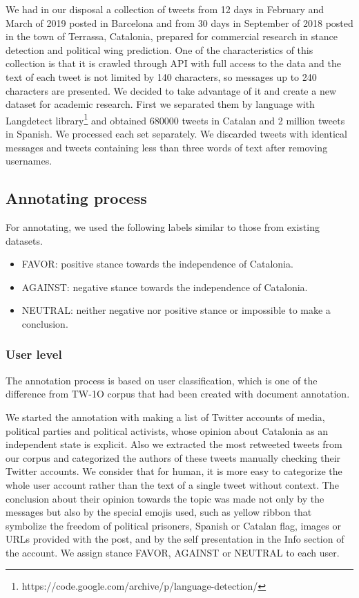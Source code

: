 \documentclass[10pt, a4paper]{article}
\begin{document}
We had in our disposal a collection of tweets from 12 days in February and March of 2019 posted in Barcelona and from 30 days in September of 2018 posted in the town of Terrassa, Catalonia, prepared for commercial research in stance detection and political wing prediction. One of the characteristics of this collection is that it is crawled through API with full access to the data and the text of each tweet is not limited by 140 characters, so messages up to 240 characters are presented. We decided to take advantage of it and create a new dataset for academic research. First we separated them by language with Langdetect library\footnote{https://code.google.com/archive/p/language-detection/} and obtained 680000 tweets in Catalan and 2 million tweets in Spanish. We processed each set separately. We discarded tweets with identical messages and tweets containing less than three words of text after removing usernames.

\subsection{Annotating process}

For annotating, we used the following labels similar to  those from existing datasets.
\begin{itemize}
\item FAVOR: positive stance towards the independence of Catalonia.
\item AGAINST: negative stance towards the independence of Catalonia.
\item NEUTRAL: neither negative nor positive stance or impossible to make a conclusion.
\end{itemize}

\subsubsection{User level}

The annotation process is based on user classification, which  is one of the difference from TW-1O corpus that had been created with document annotation.

We started the annotation with making a list of Twitter accounts of media, political parties and political activists, whose opinion about Catalonia as an independent state is explicit. Also we extracted the most retweeted tweets from our corpus and categorized the authors of these tweets manually checking their Twitter accounts. We consider that for human, it is more easy to categorize the whole user account rather than the text of a single tweet without context. The conclusion about their opinion towards the topic was made not only by the messages but also  by  the special emojis used, such as yellow ribbon that symbolize the freedom of political prisoners, Spanish or Catalan flag, images or URLs provided  with the post, and by the self presentation in the Info section of the account. We assign stance FAVOR, AGAINST or NEUTRAL to each user.
\end{document}
